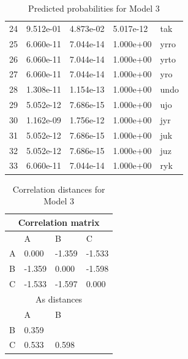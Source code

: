 \begin{table}
\begin{tabular}{lllll}
    24 & 9.512e-01     & 4.873e-02     & 5.017e-12     & tak  \\
    25 & 6.060e-11     & 7.044e-14     & 1.000e+00     & yrro \\
    26 & 6.060e-11     & 7.044e-14     & 1.000e+00     & yrto \\
    27 & 6.060e-11     & 7.044e-14     & 1.000e+00     & yro  \\
    28 & 1.308e-11     & 1.154e-13     & 1.000e+00     & undo \\
    29 & 5.052e-12     & 7.686e-15     & 1.000e+00     & ujo  \\
    30 & 1.162e-09     & 1.756e-12     & 1.000e+00     & jyr  \\
    31 & 5.052e-12     & 7.686e-15     & 1.000e+00     & juk  \\
    32 & 5.052e-12     & 7.686e-15     & 1.000e+00     & juz  \\
    33 & 6.060e-11     & 7.044e-14     & 1.000e+00     & ryk  \\
    \bottomrule
  \end{tabular}
  \caption{Predicted probabilities for Model 3}\label{tab:probabilities-model3}
\end{table}

\begin{table}%
  \centering
  \begin{tabular}{llll}
    \toprule
    \multicolumn{4}{c}{Correlation matrix} \\
    \midrule
      & A      & B      & C                \\
    \midrule
    A & 0.000  & -1.359 & -1.533           \\
    B & -1.359 & 0.000  & -1.598           \\
    C & -1.533 & -1.597 & 0.000            \\
    \midrule
    \multicolumn{4}{c}{As distances}       \\
      & A      & B                         \\
    \midrule
    B & 0.359  &                           \\
    C & 0.533  & 0.598                     \\
    \bottomrule
  \end{tabular}
  \caption{Correlation distances for Model 3}\label{tab:corr-dist-model3}
\end{table}

